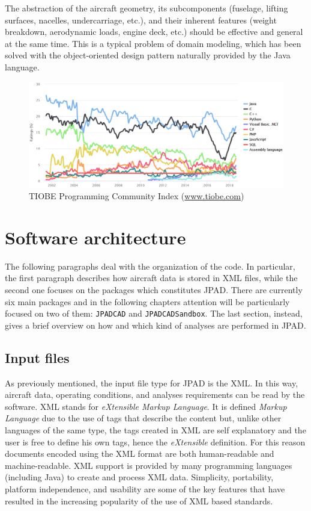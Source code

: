 \bigskip
\noindent
The abstraction of the aircraft geometry, its subcomponents (fuselage, lifting surfaces, nacelles, undercarriage, etc.), and their inherent features (weight breakdown, aerodynamic loads, engine deck, etc.) should be effective and general at the same time. This is a typical problem of domain modeling, which has been solved with the object-oriented design pattern naturally provided by the Java language.
%
\begin{figure}[H]
\centering
\includegraphics[scale=1.60]{Immagini/Capitolo1/TIOBEIndex}
\caption{TIOBE Programming Community Index (\href{www.tiobe.com}{www.tiobe.com})}
\label{fig:TIOBEIndex}
\end{figure}
%

\section{Software architecture}
\label{sec1.2}

The following paragraphs deal with the organization of the code. In particular, the first paragraph describes how aircraft data is stored in XML files, while the second one focuses on the packages which constitutes \gls{JPAD}. There are currently six main packages and in the following chapters attention will be particularly focused on two of them: \lstinline[language=Java]!JPADCAD! and \lstinline[language=Java]!JPADCADSandbox!. The last section, instead, gives a brief overview on how and which kind of analyses are performed in \gls{JPAD}.

\subsection{Input files}
As previously mentioned, the input file type for \gls{JPAD} is the XML. In this way, aircraft data, operating conditions, and analyses requirements can be read by the software. XML stands for \emph{eXtensible Markup Language}. It is defined \emph{Markup Language} due to the use of tags that describe the content but, unlike other languages of the same type, the tags created in XML are self explanatory and the user is free to define his own tags, hence the \emph{eXtensible} definition. For this reason documents encoded using the XML format are both human-readable and machine-readable. XML support is provided by many programming languages (including Java) to create and process XML data. Simplicity, portability, platform independence, and usability are some of the key features that have resulted in the increasing popularity of the use of XML based standards. \cite{xmlWiki}

